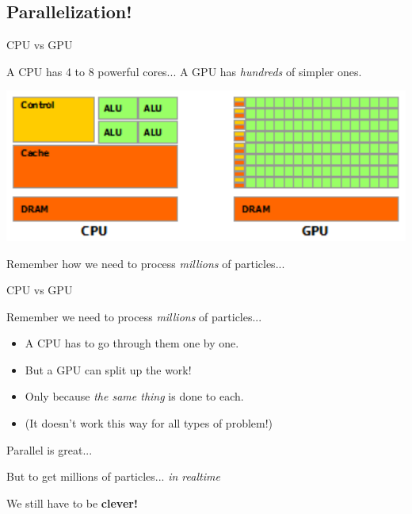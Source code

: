 \documentclass[12pt]{beamer}
\begin{document}
\subsection{Parallelization!}

\begin{frame}{CPU vs GPU}
\pause

A CPU has 4 to 8 powerful cores... \pause A GPU has \emph{hundreds} of simpler ones. \pause

\begin{center}
\includegraphics[scale=0.6]{CPU-GPU-Arch}
\end{center}

\color{white}
Remember how we need to process \emph{millions} of particles...

\end{frame}


\begin{frame}{CPU vs GPU}

\color{white}
Remember we need to process \emph{millions} of particles...

\begin{itemize}[<+->]
\item A CPU has to go through them one by one.
\item \color{green} But a GPU can split up the work!
\item Only because \emph{the same thing} is done to each.
\item \color{orange} (It doesn't work this way for all types of problem!)  
\end{itemize}

\end{frame}


\begin{frame}[plain]{}

\begin{center}
Parallel is great... \pause

But to get millions of particles... \pause \emph{in realtime}

\vspace{16pt}

\color{white}
\huge{We still have to be \textbf{clever!}}

\end{center}

\end{frame}
\end{document}
